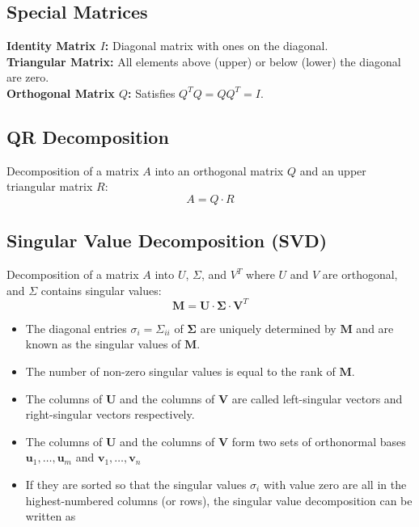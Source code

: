 \documentclass[8pt, a4paper, landscape, includeheadfoot]{extarticle}
\begin{document}
\begin{multicols*}{4}
	\Umbruch

	\subsection{Special Matrices}

	\textbf{Identity Matrix \( I \):} Diagonal matrix with ones on the diagonal.\\
	\textbf{Triangular Matrix:} All elements above (upper) or below (lower) the diagonal are zero.\\
	\textbf{Orthogonal Matrix \( Q \):} Satisfies \( Q^T Q = Q Q^T = I \).

	\subsection{QR Decomposition}
	Decomposition of a matrix \( A \) into an orthogonal matrix \( Q \) and an upper triangular matrix \( R \):
	\[
		A = Q \cdot R
	\]

	\subsection{Singular Value Decomposition (SVD)}
	Decomposition of a matrix \( A \) into \( U \), \( \Sigma \), and \( V^T \) where \( U \) and \( V \) are orthogonal, and \( \Sigma \) contains singular values:
	\[
		\mathbf M = \mathbf U \cdot \mathbf \Sigma \cdot \mathbf V^T
	\]

	\begin{itemize}[itemsep=0pt, leftmargin=8pt]
		\item The diagonal entries $\sigma_i = \Sigma_{i i}$ of $ \mathbf \Sigma$ are uniquely determined by $\mathbf M$ and are known as the singular values of $\mathbf M$.
		\item The number of non-zero singular values is equal to the rank of $\mathbf M$.
		\item The columns of ${\displaystyle \mathbf {U} }$ and the columns of ${\displaystyle \mathbf {V} }$ are called left-singular vectors and right-singular vectors respectively.
		\item The columns of $\mathbf U$ and the columns of $\mathbf V$  form two sets of orthonormal bases $\mathbf u_1, \ldots, \mathbf u_m $ and $\mathbf v_1, \ldots, \mathbf v_n$
		\item If they are sorted so that the singular values $\sigma_i$ with value zero are all in the highest-numbered columns (or rows), the singular value decomposition can be written as


\end{itemize}
\end{multicols*}
\end{document}
